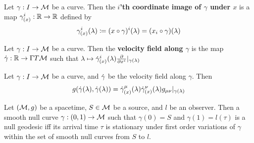 \begin{definition}[]\label{}
Let $\gamma: I \to \mathcal{M}$ be a curve. Then the \textbf{$i$'th coordinate image of $\gamma$ under $x$} is a map $\gamma^i_{(x)}: \mathbb{R} \to \mathbb{R}$ defined by
\begin{equation}\label{}
\gamma^i_{(x)}(\lambda) \coloneqq (x \circ \gamma)^i (\lambda) = (x_i \circ \gamma) (\lambda)
\end{equation}
\end{definition}
%
\begin{definition}[]\label{}
Let $\gamma: I \to \mathcal{M}$ be a curve. Then the \textbf{velocity field along $\gamma$} is the map $\dot{\gamma}: \mathbb{R} \to \Gamma T \mathcal{M}$ such that $\lambda \mapsto \vg_{(x)}^i (\lambda) \ddx{i} \rvert_{\gamma(\lambda)}$
\end{definition}
%
\begin{proposition}[]\label{}
Let $\gamma: I \to \mathcal{M}$ be a curve, and $\dot{\gamma}$ be the velocity field along $\gamma$. Then
\begin{equation}\label{}
g(\dot{\gamma}(\lambda), \dot{\gamma}(\lambda)) = \dot{\gamma}_{(x)}^{\mu}(\lambda) \dot{\gamma}_{(x)}^{\nu}(\lambda) g_{\mu \nu} \rvert_{\gamma(\lambda)}
\end{equation}
\end{proposition}
%
\begin{theorem}\label{}
Let $(\mathcal{M}, g)$ be a spacetime, $S \in \mathcal{M}$ be a source, and $l$ be an observer. Then a smooth null curve $\gamma: (0,1) \to \mathcal{M}$ such that $\gamma(0) = S$ and $\gamma(1) = l(\tau)$ is a null geodesic iff its arrival time $\tau$ is stationary under first order variations of $\gamma$ within the set of smooth null curves from $S$ to $l$.
\end{theorem}
